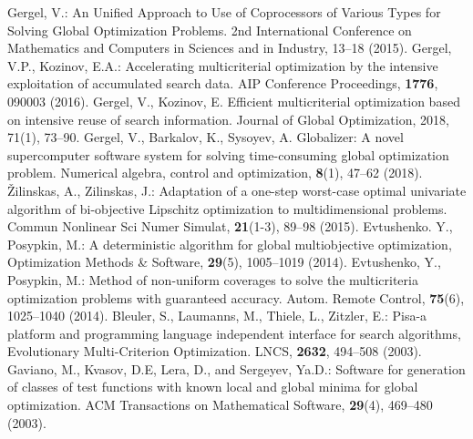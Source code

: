 \documentclass[runningheads]{llncs}
\begin{document}
\begin{thebibliography}{1}
 Gergel, V.: An Unified Approach to Use of Coprocessors of Various Types for Solving Global Optimization Problems. 2nd International Conference on Mathematics and Computers in Sciences and in Industry, 13--18 (2015). 
 Gergel, V.P., Kozinov, E.A.: Accelerating multicriterial optimization by the intensive exploitation of accumulated search data. AIP Conference Proceedings, \textbf{1776}, 090003 (2016). 
 Gergel, V., Kozinov, E. Efficient multicriterial optimization based on intensive reuse of search information. Journal of Global Optimization, 2018, 71(1), 73--90.
 Gergel, V., Barkalov, K., Sysoyev, A. Globalizer: A novel supercomputer software system for solving time-consuming global optimization problem. Numerical algebra, control and optimization, \textbf{8}(1), 47--62 (2018).
 {\v Z}ilinskas, A., Zilinskas, J.: Adaptation of a one-step worst-case optimal univariate algorithm of bi-objective Lipschitz optimization to multidimensional problems. Commun Nonlinear Sci Numer Simulat, \textbf{21}(1-3), 89--98 (2015). 
 Evtushenko. Y., Posypkin, M.: A deterministic algorithm for global multiobjective optimization, Optimization Methods \& Software, \textbf{29}(5), 1005--1019 (2014). 
 Evtushenko, Y., Posypkin, M.: Method of non-uniform coverages to solve the multicriteria optimization problems with guaranteed accuracy. Autom. Remote Control, \textbf{75}(6), 1025--1040 (2014).
 Bleuler, S., Laumanns, M., Thiele, L., Zitzler, E.: Pisa-a platform and programming language independent interface for search algorithms, Evolutionary Multi-Criterion Optimization. LNCS, \textbf{2632}, 494--508 (2003). 
 Gaviano, M., Kvasov, D.E, Lera, D., and Sergeyev, Ya.D.: Software for generation of classes of test functions with known local and global minima for global optimization. ACM Transactions on Mathematical Software, \textbf{29}(4), 469--480 (2003).
\end{thebibliography}


%
\end{document}

